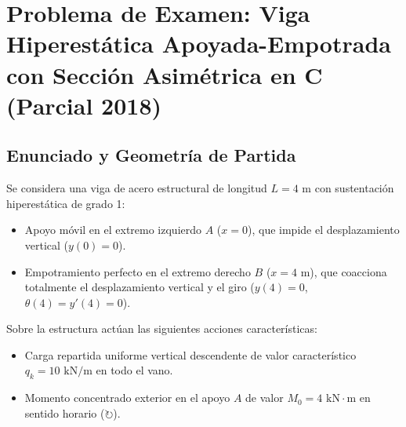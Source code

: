 \section{Problema de Examen: Viga Hiperestática Apoyada-Empotrada con Sección Asimétrica en C (Parcial 2018)}

\subsection{Enunciado y Geometría de Partida}

Se considera una viga de acero estructural de longitud $L = 4\text{ m}$ con sustentación hiperestática de grado 1:
\begin{itemize}
    \item Apoyo móvil en el extremo izquierdo $A$ ($x = 0$), que impide el desplazamiento vertical ($y(0) = 0$).
    \item Empotramiento perfecto en el extremo derecho $B$ ($x = 4\text{ m}$), que coacciona totalmente el desplazamiento vertical y el giro ($y(4) = 0$, $\theta(4) = y'(4) = 0$).
\end{itemize}

Sobre la estructura actúan las siguientes acciones características:
\begin{itemize}
    \item Carga repartida uniforme vertical descendente de valor característico $q_k = 10\text{ kN/m}$ en todo el vano.
    \item Momento concentrado exterior en el apoyo $A$ de valor $M_0 = 4\text{ kN}\cdot\text{m}$ en sentido horario ($\circlearrowright$).
\end{itemize}

